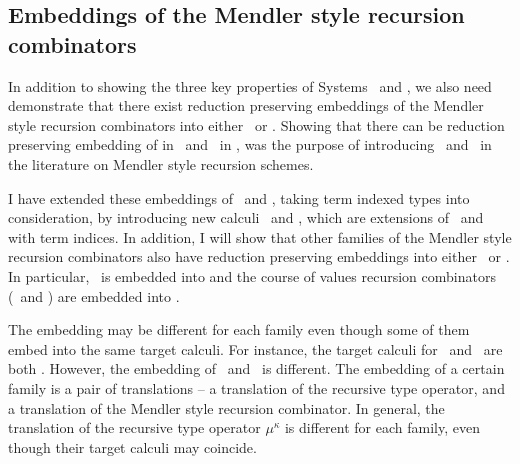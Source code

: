 \subsection{Embeddings of the Mendler style recursion combinators}
In addition to showing the three key properties of Systems \Fi\ and \Fixi,
we also need demonstrate that there exist reduction preserving embeddings
of the Mendler style recursion combinators into either \Fi\ or \Fixi.
Showing that there can be reduction preserving embedding of \MIt in \Fw\
and \MPr\ in \Fixw, was the purpose of introducing \Fw\ and \Fixw\
in the literature on Mendler style recursion schemes.

I have extended these embeddings of \MIt\ and \MPr, taking term indexed
types into consideration, by introducing new calculi \Fi\ and \Fixw,
which are extensions of \Fw\ and \Fixi with term indices. In addition,
I will show that other families of the Mendler style recursion combinators
also have reduction preserving embeddings into either \Fi\ or \Fixi.
In particular, \MsfIt\ is embedded into \Fi and the course of values
recursion combinators (\McvIt\ and \McvPr) are embedded into \Fixi.

The embedding may be different for each family even though some of
them embed into the same target calculi. For instance, the target
calculi for \MIt\ and \MsfIt\ are both \Fi. However, the embedding
of \MIt\ and \MsfIt\ is different. The embedding of a certain family
is a pair of translations -- a translation of the recursive type operator,
and a translation of the Mendler style recursion combinator. In general,
the translation of the recursive type operator $\mu^\kappa$ is different for
each family, even though their target calculi may coincide.

